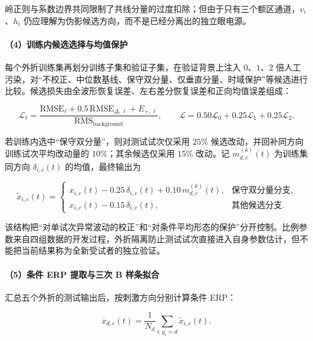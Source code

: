 \documentclass[a4paper,zihao=-4,linespread=1]{ctexart}
\numberwithin{figure}{section}       %
\begin{document}
岭正则与系数边界共同限制了共线分量的过度扣除；但由于只有三个额区通道，$v_i$、$h_i$ 仍应理解为伪影候选方向，而不是已经分离出的独立眼电源。

\paragraph{（4）训练内候选选择与均值保护}

每个外折训练集再划分训练子集和验证子集，在验证背景上注入 $0$、$1$、$2$ 倍人工污染，对“不校正、中位数基线、保守双分量、仅垂直分量、时域保护”等候选进行比较。候选损失由全波形恢复误差、左右差分恢复误差和正向均值误差组成：

\begin{equation}
    \mathcal L_{\ell}=
    \frac{\mathrm{RMSE}_{\ell}+0.5\,\mathrm{RMSE}_{\Delta,\ell}+E_{+,\ell}}
    {\mathrm{RMS}_{\mathrm{background}}},
    \qquad
    \mathcal L=0.50\mathcal L_0+0.25\mathcal L_1+0.25\mathcal L_2.
    \label{eq:q1_selection}
\end{equation}

若训练内选中“保守双分量”，则对测试试次仅采用 $25\%$ 候选改动，并回补同方向训练试次平均改动量的 $10\%$；其余候选仅采用 $15\%$ 改动。记 $m^{(k)}_{d,c}(t)$ 为训练集同方向 $\delta_{i,c}(t)$ 的均值，最终输出为

\begin{equation}
    \tilde x_{i,c}(t)=
    \begin{cases}
        x_{i,c}(t)-0.25\,\delta_{i,c}(t)+0.10\,m^{(k)}_{d,c}(t),
        & \text{保守双分量分支},\\
        x_{i,c}(t)-0.15\,\delta_{i,c}(t),
        & \text{其他候选分支}.
    \end{cases}
    \label{eq:q1_meanprotect}
\end{equation}

该结构把“对单试次异常波动的校正”和“对条件平均形态的保护”分开控制。比例参数来自四组数据的开发过程，外折隔离防止测试试次直接进入自身参数估计，但不能把当前结果称为全新受试者的独立验证。

\paragraph{（5）条件 ERP 提取与三次 B 样条拟合}

汇总五个外折的测试输出后，按刺激方向分别计算条件 ERP：

\begin{equation}
    \overline{x}_{d,c}(t)=\frac{1}{N_d}
    \sum_{i:y_i=d}\tilde x_{i,c}(t).
    \label{eq:q1_erp}
\end{equation}
\end{document}
